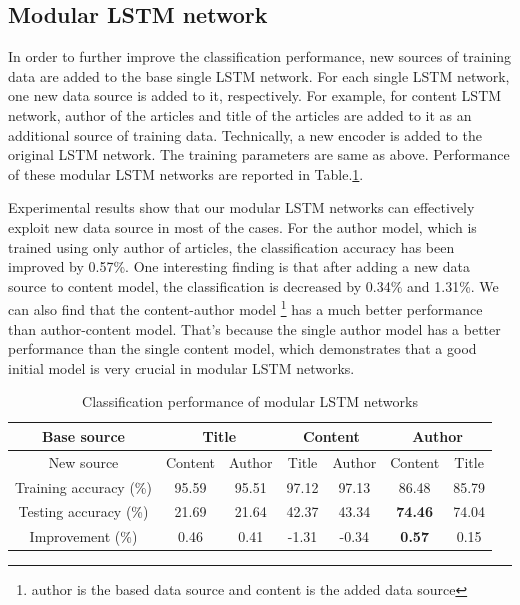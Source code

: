 \documentclass[12pt]{article}
\begin{document}
\subsection{Modular LSTM network}

In order to further improve the classification performance, new sources of training data are added to the base single LSTM network. For each single LSTM network, one new data source is added to it, respectively. For example, for content LSTM network, author of the articles and title of the articles are added to it as an additional source of training data. Technically, a new encoder is added to the original LSTM network. The training parameters are same as above. Performance of these modular LSTM networks are reported in Table.\ref{modular_lstm_acc}.

Experimental results show that our modular LSTM networks can effectively exploit new data source in most of the cases. For the author model, which is trained using only author of articles, the classification accuracy has been improved by 0.57\%. One interesting finding is that after adding a new data source to content model, the classification is decreased by 0.34\% and 1.31\%. We can also find that the content-author model \footnote{author is the based data source and content is the added data source} has a much better performance than author-content model. That's because the single author model has a better performance than the single content model, which demonstrates that a good initial model is very crucial in modular LSTM networks.


\begin{table}[!t]
\begin{center}
\caption{Classification performance of modular LSTM networks}
\label{modular_lstm_acc}
\begin{tabular}{c|cc|cc|cc}
\hline

Base source & \multicolumn{2}{c}{Title} & \multicolumn{2}{c}{Content} & \multicolumn{2}{c}{Author} \\
\hline
New source   &   Content   &   Author     &       Title  & Author                &            Content & Title \\
\hline
Training accuracy (\%)   & 95.59  &   95.51    &   97.12   &   97.13    &  86.48  & 85.79\\
Testing accuracy (\%)   &  21.69  &     21.64   &   42.37  &    43.34   &  \textbf{74.46}    & 74.04\\
\hline
Improvement (\%) &           0.46 &     0.41     &      -1.31    &    -0.34  &   \textbf{0.57}   & 0.15 \\

\hline


\hline
\end{tabular}
\end{center}
\end{table}
\end{document}
